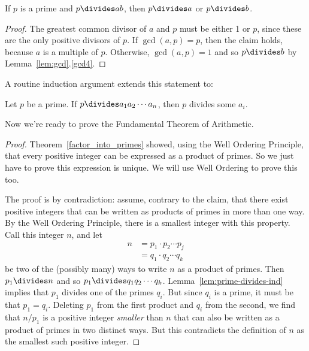 \begin{lemma}
\label{lem:prime-divides}
If $p$ is a prime and $p \divides ab$, then $p \divides a$ or $p \divides b$.
\end{lemma}

\begin{proof}
The greatest common divisor of $a$ and $p$ must be either 1 or $p$,
since these are the only positive divisors of $p$.  If $\gcd(a, p) = p$, 
then the claim holds, because $a$ is a multiple of $p$.  Otherwise,
$\gcd(a, p) = 1$ and so $p \divides b$ by Lemma~\ref{lem:gcd}.\ref{gcd4}.
\end{proof}

A routine induction argument extends this statement to:\iffalse the fact
we assumed last time:\fi

\begin{lemma}
\label{lem:prime-divides-ind}
Let $p$ be a prime.  If $p \divides a_1 a_2 \cdots a_n$, then $p$ divides
some $a_i$.
\end{lemma}

Now we're ready to prove the Fundamental Theorem of Arithmetic.
\begin{proof}
Theorem~\ref{factor_into_primes} showed, using the Well Ordering
Principle, that every positive integer can be expressed as a product
of primes.  So we just have to prove this expression is unique.  We
will use Well Ordering to prove this too.

\iffalse
First, we use strong induction to prove that every positive integer
$n$ is a product of primes.  As a base case, $n = 1$ is the product of
the empty set of primes.  For the inductive step, suppose that every
$k < n$ is a product of primes.  We must show that $n$ is also a
product of primes.  If $n$ is itself prime, then this is true
trivially.  Otherwise, $n = a b$ for some $a, b < n$.  By the
induction assumption, $a$ and $b$ are both products of primes.
Therefore, $a \cdot b = n$ is also a product of primes.  Thus, the
claim is proved by induction.
\fi

The proof is by contradiction: assume, contrary to the claim, that there
exist positive integers that can be written as products of primes in more
than one way.  By the Well Ordering Principle, there is a smallest integer
with this property.  Call this integer $n$, and let
%
\begin{align*}
n & = p_1 \cdot p_2 \cdots p_j \\
  & = q_1 \cdot q_2 \cdots q_k
\end{align*}
%
be two of the (possibly many) ways to write $n$ as a product of
primes.  Then $p_1 \divides n$ and so $p_1 \divides q_1 q_2 \cdots q_k$.
Lemma~\ref{lem:prime-divides-ind} implies that $p_1$ divides one of
the primes $q_i$.  But since $q_i$ is a prime, it must be that $p_1 =
q_i$.  Deleting $p_1$ from the first product and $q_i$ from the
second, we find that $n / p_1$ is a positive integer \emph{smaller}
than $n$ that can also be written as a product of primes in two
distinct ways.  But this contradicts the definition of $n$ as the
smallest such positive integer.
\end{proof}


